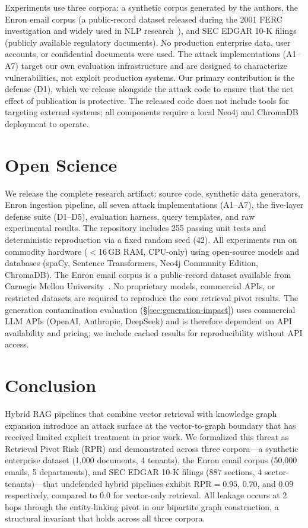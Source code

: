 \documentclass[letterpaper,twocolumn,10pt]{article}
\begin{document}
Experiments use three corpora: a synthetic corpus generated by the
authors, the Enron email corpus (a public-record dataset
released during the 2001 FERC investigation and widely used in NLP
research~\cite{enroncorpus2015}), and SEC EDGAR 10-K filings (publicly
available regulatory documents). No production enterprise data, user
accounts, or confidential documents were used. The attack
implementations (A1--A7) target our own evaluation infrastructure
and are designed to characterize vulnerabilities, not exploit
production systems. Our primary contribution is the defense (D1),
which we release alongside the attack code to ensure that the net
effect of publication is protective. The released code does not
include tools for targeting external systems; all components require
a local Neo4j and ChromaDB deployment to operate.

\section*{Open Science}

We release the complete research artifact: source code, synthetic data
generators, Enron ingestion pipeline, all seven attack implementations
(A1--A7), the five-layer defense suite (D1--D5), evaluation harness,
query templates, and raw experimental results. The repository includes
255 passing unit tests and deterministic reproduction via a fixed random
seed (42). All experiments run on commodity hardware ($<$16\,GB RAM,
CPU-only) using open-source models and databases (spaCy, Sentence
Transformers, Neo4j Community Edition, ChromaDB). The Enron email corpus
is a public-record dataset available from Carnegie Mellon
University~\cite{enroncorpus2015}. No proprietary models, commercial APIs,
or restricted datasets are required to reproduce the core retrieval pivot
results. The generation contamination evaluation
(\S\ref{sec:generation-impact}) uses commercial LLM APIs (OpenAI,
Anthropic, DeepSeek) and is therefore dependent on API availability and
pricing; we include cached results for reproducibility without API access.

\section{Conclusion}
\label{sec:conclusion}

Hybrid RAG pipelines that combine vector retrieval with knowledge
graph expansion introduce an attack surface at the vector-to-graph
boundary that has received limited explicit treatment in prior work.
We formalized this threat as Retrieval Pivot Risk (RPR) and
demonstrated across three corpora---a synthetic enterprise dataset
(1{,}000 documents, 4 tenants), the Enron email corpus (50{,}000
emails, 5 departments), and SEC EDGAR 10-K filings (887 sections,
4 sector-tenants)---that undefended hybrid pipelines exhibit
$\text{RPR} = 0.95$, $0.70$, and $0.09$ respectively, compared to
$0.0$ for vector-only retrieval. All leakage occurs at 2 hops through
the entity-linking pivot in our bipartite graph construction, a
structural invariant that holds across all three corpora.
\end{document}
